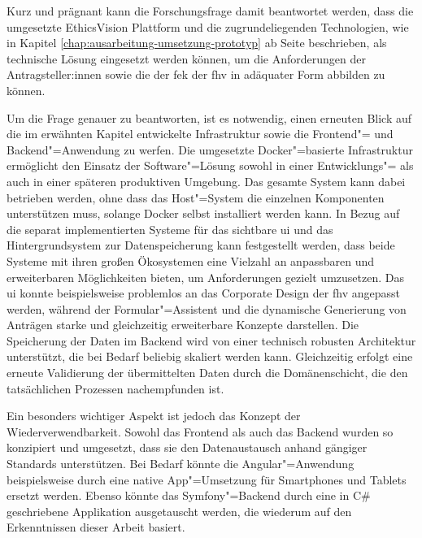 \documentclass[a4paper,12pt,twoside]{scrreprt}
\begin{document}
\medskip

Kurz und prägnant kann die Forschungsfrage damit beantwortet werden, dass die umgesetzte EthicsVision Plattform und die zugrundeliegenden Technologien, wie in Kapitel \ref{chap:ausarbeitung-umsetzung-prototyp} ab Seite \pageref{chap:ausarbeitung-umsetzung-prototyp} beschrieben, als technische Lösung eingesetzt werden können, um die Anforderungen der Antragsteller:innen sowie die der \acl{fek} der \acl{fhv} in adäquater Form abbilden zu können.

\smallskip

Um die Frage genauer zu beantworten, ist es notwendig, einen erneuten Blick auf die im erwähnten Kapitel entwickelte Infrastruktur sowie die Frontend"= und Backend"=Anwendung zu werfen. Die umgesetzte Docker"=basierte Infrastruktur ermöglicht den Einsatz der Software"=Lösung sowohl in einer Entwicklungs"= als auch in einer späteren produktiven Umgebung. Das gesamte System kann dabei betrieben werden, ohne dass das Host"=System die einzelnen Komponenten unterstützen muss, solange Docker selbst installiert werden kann. In Bezug auf die separat implementierten Systeme für das sichtbare \ac{ui} und das Hintergrundsystem zur Datenspeicherung kann festgestellt werden, dass beide Systeme mit ihren großen Ökosystemen eine Vielzahl an anpassbaren und erweiterbaren Möglichkeiten bieten, um Anforderungen gezielt umzusetzen. Das \ac{ui} konnte beispielsweise problemlos an das Corporate Design der \ac{fhv} angepasst werden, während der Formular"=Assistent und die dynamische Generierung von Anträgen starke und gleichzeitig erweiterbare Konzepte darstellen. Die Speicherung der Daten im Backend wird von einer technisch robusten Architektur unterstützt, die bei Bedarf beliebig skaliert werden kann. Gleichzeitig erfolgt eine erneute Validierung der übermittelten Daten durch die Domänenschicht, die den tatsächlichen Prozessen nachempfunden ist.

Ein besonders wichtiger Aspekt ist jedoch das Konzept der Wiederverwendbarkeit. Sowohl das Frontend als auch das Backend wurden so konzipiert und umgesetzt, dass sie den Datenaustausch anhand gängiger Standards unterstützen. Bei Bedarf könnte die Angular"=Anwendung beispielsweise durch eine native App"=Umsetzung für Smartphones und Tablets ersetzt werden. Ebenso könnte das Symfony"=Backend durch eine in C\# geschriebene Applikation ausgetauscht werden, die wiederum auf den Erkenntnissen dieser Arbeit basiert.

\medskip
\end{document}
